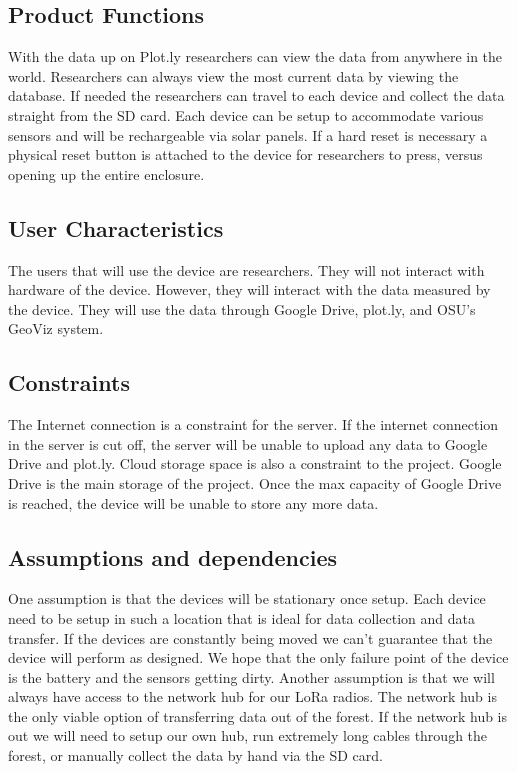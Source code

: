 \documentclass[onecolumn, draftclsnofoot,10pt, compsoc]{IEEEtran}
\begin{document}
\subsection{Product Functions}
With the data up on Plot.ly researchers can view the data from anywhere in the world.  Researchers can always view the most current data by viewing the database.  If needed the researchers can travel to each device and collect the data straight from the SD card.
\newline
Each device can be setup to accommodate various sensors and will be rechargeable via solar panels.  If a hard reset is necessary a physical reset button is attached to the device for researchers to press, versus opening up the entire enclosure.
\subsection{User Characteristics}
The users that will use the device are researchers. They will not interact with hardware of the device. However, they will interact with the data measured by the device. They will use the data through Google Drive, plot.ly, and OSU’s GeoViz system. 
\subsection{Constraints}
The Internet connection is a constraint for the server. If the internet connection in the server is cut off, the server will be unable to upload any data to Google Drive and plot.ly.
\newline
Cloud storage space is also a constraint to the project. Google Drive is the main storage of the project. Once the max capacity of Google Drive is reached, the device will be unable to store any more data. 
\subsection {Assumptions and dependencies}
One assumption is that the devices will be stationary once setup.  Each device need to be setup in such a location that is ideal for data collection and data transfer.  If the devices are constantly being moved we can’t guarantee that the device will perform as designed.  We hope that the only failure point of the device is the battery and the sensors getting dirty.
\newline
Another assumption is that we will always have access to the network hub for our LoRa radios.  The network hub is the only viable option of transferring data out of the forest.  If the network hub is out we will need to setup our own hub, run extremely long cables through the forest, or manually collect the data by hand via the SD card.
\end{document}
